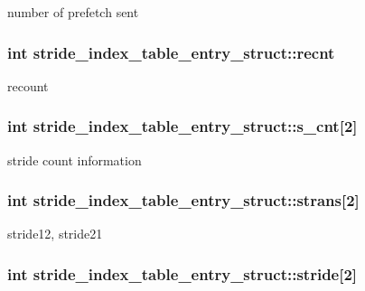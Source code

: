 \label{structstride__index__table__entry__struct_aded3dabc4e2feb36882e1fad32cc1838}
number of prefetch sent \hypertarget{structstride__index__table__entry__struct_a63c588de02283aa0f86a28e56c4163d4}{
\subsubsection[{recnt}]{\setlength{\rightskip}{0pt plus 5cm}int {\bf stride\_\-index\_\-table\_\-entry\_\-struct::recnt}}}
\label{structstride__index__table__entry__struct_a63c588de02283aa0f86a28e56c4163d4}
recount \hypertarget{structstride__index__table__entry__struct_afdaa50e588890ef2751ff99c9efda6b6}{
\subsubsection[{s\_\-cnt}]{\setlength{\rightskip}{0pt plus 5cm}int {\bf stride\_\-index\_\-table\_\-entry\_\-struct::s\_\-cnt}\mbox{[}2\mbox{]}}}
\label{structstride__index__table__entry__struct_afdaa50e588890ef2751ff99c9efda6b6}
stride count information \hypertarget{structstride__index__table__entry__struct_a07f4956bed2ef638ad28455e0fae24d5}{
\subsubsection[{strans}]{\setlength{\rightskip}{0pt plus 5cm}int {\bf stride\_\-index\_\-table\_\-entry\_\-struct::strans}\mbox{[}2\mbox{]}}}
\label{structstride__index__table__entry__struct_a07f4956bed2ef638ad28455e0fae24d5}
stride12, stride21 \hypertarget{structstride__index__table__entry__struct_a4f2bc804c4b802bdfb6cbdf06483469b}{
\subsubsection[{stride}]{\setlength{\rightskip}{0pt plus 5cm}int {\bf stride\_\-index\_\-table\_\-entry\_\-struct::stride}\mbox{[}2\mbox{]}}}
